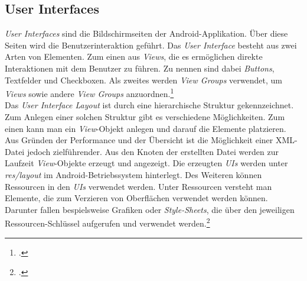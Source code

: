 \subsection{User Interfaces}
\label{ssec:android-ui}
\textit{User Interfaces} sind die Bildschirmseiten der Android-Applikation. Über diese Seiten wird die Benutzerinteraktion geführt. Das \textit{User Interface} besteht aus zwei Arten von Elementen. Zum einen aus \textit{Views}, die es ermöglichen direkte Interaktionen mit dem Benutzer zu führen. Zu nennen sind dabei \textit{Buttons}, Textfelder und Checkboxen. Als zweites werden \textit{View Groups} verwendet, um \textit{Views} sowie andere \textit{View Groups} anzuordnen.\footcite[S. 40f.]{Android-BeckerPant}\\
Das \textit{User Interface Layout} ist durch eine hierarchische Struktur gekennzeichnet. Zum Anlegen einer solchen Struktur gibt es verschiedene Möglichkeiten. Zum einen kann man ein \textit{View}-Objekt anlegen und darauf die Elemente platzieren. Aus Gründen der Performance und der Übersicht ist die Möglichkeit einer \ac{XML}-Datei jedoch zielführender. Aus den Knoten der erstellten Datei werden zur Laufzeit \textit{View}-Objekte erzeugt und angezeigt. Die erzeugten \textit{UIs} werden unter \textit{res/layout} im Android-Betriebssystem hinterlegt. Des Weiteren können Ressourcen in den \textit{UIs} verwendet werden. Unter Ressourcen versteht man Elemente, die zum Verzieren von Oberflächen verwendet werden können. Darunter fallen bespielsweise Grafiken oder \textit{Style-Sheets}, die über den jeweiligen Ressourcen-Schlüssel aufgerufen und verwendet werden.\footcite{Android-UI}
